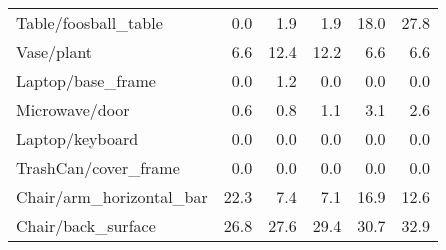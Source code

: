 \begin{table}[!h]
\begin{tabular}{lrrrrr}
Table/foosball\_table           &            0.0 &             1.9 &                     1.9 &          18.0 &                  27.8 \\
Vase/plant                     &            6.6 &            12.4 &                    12.2 &           6.6 &                   6.6 \\
Laptop/base\_frame              &            0.0 &             1.2 &                     0.0 &           0.0 &                   0.0 \\
Microwave/door                 &            0.6 &             0.8 &                     1.1 &           3.1 &                   2.6 \\
Laptop/keyboard                &            0.0 &             0.0 &                     0.0 &           0.0 &                   0.0 \\
TrashCan/cover\_frame           &            0.0 &             0.0 &                     0.0 &           0.0 &                   0.0 \\
Chair/arm\_horizontal\_bar       &           22.3 &             7.4 &                     7.1 &          16.9 &                  12.6 \\
Chair/back\_surface             &           26.8 &            27.6 &                    29.4 &          30.7 &                  32.9 \\
\bottomrule
\end{tabular}
\end{table}

